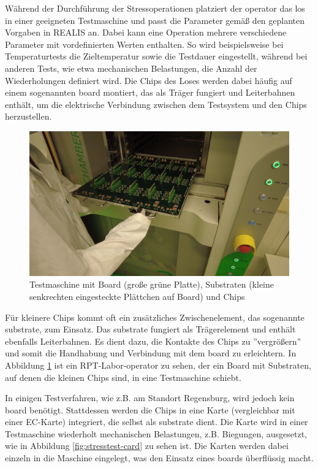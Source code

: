 Während der Durchführung der Stressoperationen platziert der \gls{operator} das \gls{los} in einer geeigneten Testmaschine und passt die Parameter gemäß den geplanten Vorgaben in \gls{REALIS} an. Dabei kann eine Operation mehrere verschiedene Parameter mit vordefinierten Werten enthalten. So wird beispielsweise bei Temperaturtests die Zieltemperatur sowie die Testdauer eingestellt, während bei anderen Tests, wie etwa mechanischen Belastungen, die Anzahl der Wiederholungen definiert wird. Die Chips des Loses werden dabei häufig auf einem sogenannten \gls{board} montiert, das als Träger fungiert und Leiterbahnen enthält, um die elektrische Verbindung zwischen dem Testsystem und den Chips herzustellen.

\begin{figure}[!htbp]
    \centering
    \includegraphics[width=1\textwidth]{bilder/testmaschine-with-board-substrate.png}
    \caption{Testmaschine mit Board (große grüne Platte), Substraten (kleine senkrechten eingesteckte Plättchen auf Board) und Chips \cite{RPTLaborIntern}}
    \label{fig:testmachine-with-board-substrate}
\end{figure}

Für kleinere Chips kommt oft ein zusätzliches Zwischenelement, das sogenannte \gls{substrate}, zum Einsatz. Das \gls{substrate} fungiert als Trägerelement und enthält ebenfalls Leiterbahnen. Es dient dazu, die Kontakte des Chips zu ''vergrößern'' und somit die Handhabung und Verbindung mit dem \gls{board} zu erleichtern.
In Abbildung \ref{fig:testmachine-with-board-substrate} ist ein \gls{RPT}-Labor-\gls{operator} zu sehen, der ein Board mit Substraten, auf denen die kleinen Chips sind, in eine Testmaschine schiebt.


In einigen Testverfahren, wie z.B. am Standort Regensburg, wird jedoch kein \gls{board} benötigt. Stattdessen werden die Chips in eine Karte (vergleichbar mit einer EC-Karte) integriert, die selbst als \gls{substrate} dient. Die Karte wird in einer Testmaschine wiederholt mechanischen Belastungen, z.B. Biegungen, ausgesetzt, wie in Abbildung \ref{fig:stresstest-card} zu sehen ist. Die Karten werden dabei einzeln in die Maschine eingelegt, was den Einsatz eines \glspl{board} überflüssig macht.

